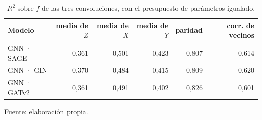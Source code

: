 \begin{table}[htbp]
    \centering
    {\footnotesize
    \begin{tabular}{@{}lrrrrr@{}}
        \toprule
        \textbf{Modelo} & \textbf{media de $Z$} & \textbf{media de $X$} & \textbf{media de $Y$} & \textbf{paridad} & \textbf{corr. de vecinos} \\
        \midrule
        GNN · SAGE & 0,361 & 0,501 & 0,423 & 0,807 & 0,614 \\
        GNN · GIN & 0,370 & 0,484 & 0,415 & 0,809 & 0,620 \\
        GNN · GATv2 & 0,361 & 0,491 & 0,402 & 0,826 & 0,601 \\
        \bottomrule
    \end{tabular}}

    \caption{$R^2$ sobre $f$ de las tres convoluciones, con el presupuesto de parámetros igualado.}
    \label{tab:comparativa_convs}

    {\footnotesize Fuente: elaboración propia.}
\end{table}
